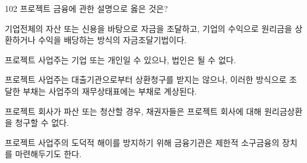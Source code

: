 \begin{question}{102}
프로젝트 금융에 관한 설명으로 옳은 것은?
\begin{choices}
  \item 기업전체의 자산 또는 신용을 바탕으로 자금을 조달하고, 기업의 수익으로 원리금을 상환하거나 수익을 배당하는 방식의 자금조달기법이다.
  \item 프로젝트 사업주는 기업 또는 개인일 수 있으나, 법인은 될 수 없다.
  \item 프로젝트 사업주는 대출기관으로부터 상환청구를 받지는 않으나, 이러한 방식으로 조달한 부채는 사업주의 재무상태표에는 부채로 계상된다.
  \item 프로젝트 회사가 파산 또는 청산할 경우, 채권자들은 프로젝트 회사에 대해 원리금상환을 청구할 수 없다.
  \item 프로젝트 사업주의 도덕적 해이를 방지하기 위해 금융기관은 제한적 소구금융의 장치를 마련해두기도 한다.
\end{choices}
\end{question}
